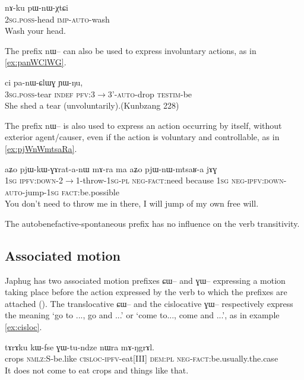 \documentclass[oldfontcommands,oneside,a4paper,11pt]{article}
\newcommand{\ipa}[1]{{\phon #1}} %
\begin{document}
\begin{exe}
\ex \label{ex:pWnWXtCi}
\gll 
\ipa{nɤ-ku} 	\ipa{pɯ-nɯ-χtɕi} \\
\textsc{2sg.poss}-head \textsc{imp-auto}-wash \\
\glt Wash your head.
\end{exe}

The prefix \ipa{nɯ--} can also be used to express involuntary actions, as in \ref{ex:panWClWG}.

\begin{exe}
\ex \label{ex:panWClWG}
\gll \ipa{ɯ-qom} 	\ipa{ci} 	\ipa{pa-nɯ-ɕlɯɣ} 	\ipa{ɲɯ-ŋu,} \\
\textsc{3sg.poss}-tear \textsc{indef} \textsc{pfv:3$\rightarrow$3'-auto}-drop \textsc{testim}-be \\
\glt She shed a tear (unvoluntarily).(Kunbzang 228)
\end{exe}


The prefix \ipa{nɯ--} is also used to express an action occurring by itself, without exterior agent/causer, even if the action is voluntary and controllable, as in \ref{ex:pjWnWmtsaRa}.

\begin{exe}
\ex \label{ex:pjWnWmtsaRa}
\gll 
\ipa{aʑo} 	\ipa{pjɯ-kɯ-ɣɤrat-a-nɯ} 	\ipa{mɤ-ra} 	\ipa{ma} 	\ipa{aʑo} 	\ipa{pjɯ-nɯ-mtsaʁ-a} 	\ipa{jɤɣ} \\
\textsc{1sg} \textsc{ipfv:down}-2$\rightarrow$1-throw-\textsc{1sg-pl} \textsc{neg-fact}:need because \textsc{1sg} \textsc{neg-ipfv:down-auto}-jump-\textsc{1sg} \textsc{fact}:be.possible \\
\glt You don't need to throw me in there, I will jump of my own free will.
\end{exe}

The autobenefactive-spontaneous prefix has no influence on the verb transitivity.

\subsection{Associated motion}
Japhug has two associated motion prefixes \ipa{ɕɯ--} and \ipa{ɣɯ--} expressing a motion taking place before the action expressed by the verb to which the prefixes are attached 
(\citealt{jacques13harmonization}). The translocative \ipa{ɕɯ--} and the cislocative \ipa{ɣɯ--} respectively express the meaning `go to ..., go and ...' or `come to..., come and ...', as in example \ref{ex:cisloc}.


\begin{exe}
\ex \label{ex:cisloc}
\gll
\ipa{tɤrɤku} 	\ipa{kɯ-fse} 	\ipa{ɣɯ-tu-ndze} 	\ipa{nɯra} 	\ipa{mɤ-ŋgrɤl.} \\
crops \textsc{nmlz}:S-be.like \textsc{cisloc-ipfv}-eat[III] \textsc{dem:pl} \textsc{neg-fact}:be.usually.the.case \\
\glt It does not come to eat crops and things like that.
\end{exe}
\end{document}
